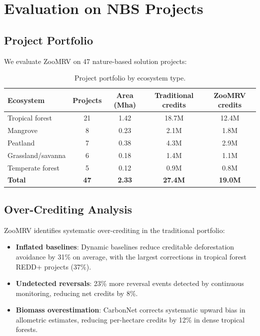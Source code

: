 \section{Evaluation on NBS Projects}

\label{sec:evaluation}

\subsection{Project Portfolio}

We evaluate ZooMRV on 47 nature-based solution projects:

\begin{table}[H]
\centering
\caption{Project portfolio by ecosystem type.}
\label{tab:portfolio}
\begin{tabular}{lcccc}
\toprule
\textbf{Ecosystem} & \textbf{Projects} & \textbf{Area (Mha)} &
  \textbf{Traditional credits} & \textbf{ZooMRV credits} \\
\midrule
Tropical forest & 21 & 1.42 & 18.7M & 12.4M \\
Mangrove & 8 & 0.23 & 2.1M & 1.8M \\
Peatland & 7 & 0.38 & 4.3M & 2.9M \\
Grassland/savanna & 6 & 0.18 & 1.4M & 1.1M \\
Temperate forest & 5 & 0.12 & 0.9M & 0.8M \\
\midrule
\textbf{Total} & \textbf{47} & \textbf{2.33} & \textbf{27.4M} &
  \textbf{19.0M} \\
\bottomrule
\end{tabular}
\end{table}

\subsection{Over-Crediting Analysis}

ZooMRV identifies systematic over-crediting in the traditional portfolio:

\begin{itemize}
  \item \textbf{Inflated baselines}: Dynamic baselines reduce creditable
    deforestation avoidance by 31\% on average, with the largest
    corrections in tropical forest REDD+ projects (37\%).
  \item \textbf{Undetected reversals}: 23\% more reversal events
    detected by continuous monitoring, reducing net credits by 8\%.
  \item \textbf{Biomass overestimation}: CarbonNet corrects systematic
    upward bias in allometric estimates, reducing per-hectare credits by
    12\% in dense tropical forests.
\end{itemize}

